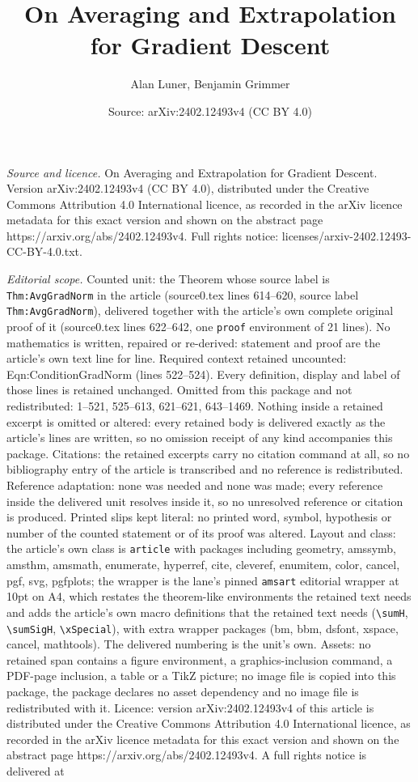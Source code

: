 \documentclass[10pt,a4paper]{amsart}
\title[On Averaging and Extrapolation for Gradient Descent]{On Averaging and Extrapolation for Gradient Descent}
\author{Alan Luner, Benjamin Grimmer}
\date{Source: arXiv:2402.12493v4 (CC BY 4.0)}
\begin{document}
\maketitle

\noindent\emph{Source and licence.} On Averaging and Extrapolation for Gradient Descent. Version arXiv:2402.12493v4 (CC BY 4.0), distributed under the Creative Commons Attribution 4.0 International licence, as recorded in the arXiv licence metadata for this exact version and shown on the abstract page https://arxiv.org/abs/2402.12493v4. Full rights notice: licenses/arxiv-2402.12493-CC-BY-4.0.txt.\par\smallskip

\noindent\textit{Editorial scope.} Counted unit: the Theorem whose source label is \texttt{Thm:AvgGradNorm} in the article (source0.tex lines 614--620, source label \texttt{Thm:AvgGradNorm}), delivered together with the article's own complete original proof of it (source0.tex lines 622--642, one \texttt{proof} environment of 21 lines). No mathematics is written, repaired or re-derived: statement and proof are the article's own text line for line. Required context retained uncounted: Eqn:ConditionGradNorm (lines 522--524). Every definition, display and label of those lines is retained unchanged. Omitted from this package and not redistributed: 1--521, 525--613, 621--621, 643--1469. Nothing inside a retained excerpt is omitted or altered: every retained body is delivered exactly as the article's lines are written, so no omission receipt of any kind accompanies this package. Citations: the retained excerpts carry no citation command at all, so no bibliography entry of the article is transcribed and no reference is redistributed. Reference adaptation: none was needed and none was made; every reference inside the delivered unit resolves inside it, so no unresolved reference or citation is produced. Printed slips kept literal: no printed word, symbol, hypothesis or number of the counted statement or of its proof was altered. Layout and class: the article's own class is \texttt{article} with packages including geometry, amssymb, amsthm, amsmath, enumerate, hyperref, cite, cleveref, enumitem, color, cancel, pgf, svg, pgfplots; the wrapper is the lane's pinned \texttt{amsart} editorial wrapper at 10pt on A4, which restates the theorem-like environments the retained text needs and adds the article's own macro definitions that the retained text needs (\texttt{\textbackslash sumH}, \texttt{\textbackslash sumSigH}, \texttt{\textbackslash xSpecial}), with extra wrapper packages (bm, bbm, dsfont, xspace, cancel, mathtools). The delivered numbering is the unit's own. Assets: no retained span contains a figure environment, a graphics-inclusion command, a PDF-page inclusion, a table or a TikZ picture; no image file is copied into this package, the package declares no asset dependency and no image file is redistributed with it. Licence: version arXiv:2402.12493v4 of this article is distributed under the Creative Commons Attribution 4.0 International licence, as recorded in the arXiv licence metadata for this exact version and shown on the abstract page https://arxiv.org/abs/2402.12493v4. A full rights notice is delivered at 
\end{document}
